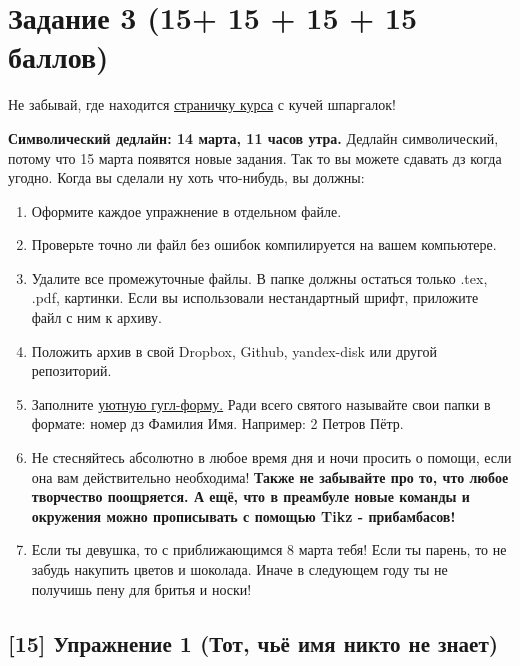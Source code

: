 \documentclass[12pt, a4paper, oneside]{article}
\begin{document}
\section*{Задание 3 (15+ 15 + 15 + 15 баллов)  }

Не забывай, где находится  \href{https://fulyankin.github.io/LaTeX/}{страничку курса} с кучей шпаргалок!

   \textbf{Символический дедлайн: 14 марта, 11 часов утра.}   Дедлайн символический, потому что 15 марта появятся новые задания. Так то вы можете сдавать дз когда угодно. Когда вы сделали ну хоть что-нибудь, вы должны: 

\begin{enumerate}
\item Оформите каждое упражнение в отдельном файле.
\item Проверьте точно ли файл без ошибок компилируется на вашем компьютере.
\item Удалите все промежуточные файлы. В папке должны остаться только .tex, .pdf, картинки. Если вы использовали нестандартный шрифт, приложите файл с ним к архиву.
\item Положить архив в	свой	Dropbox,	Github,	yandex-disk	или другой	репозиторий.
\item Заполните	\href{https://docs.google.com/forms/d/e/1FAIpQLSe11kxKVfv07iCL1E9yNX7ll9swKImiVwRr1H70lslGzInRSg/viewform}{уютную гугл-форму.} Ради всего святого называйте свои папки в формате: номер дз Фамилия Имя. Например: 2 Петров Пётр.
\item Не стесняйтесь абсолютно в любое время дня и ночи просить о помощи, если она вам действительно необходима! \textbf{Также не забывайте про то, что любое творчество поощряется. А ещё, что в преамбуле новые команды и окружения можно прописывать с помощью Tikz - прибамбасов! }
\item Если ты девушка, то с приближающимся 8 марта тебя! Если ты парень, то не забудь накупить цветов и шоколада. Иначе в следующем году ты не получишь пену для бритья и носки!
\end{enumerate}

\subsection*{[15]   Упражнение 1 (Тот, чьё имя никто не знает)}
\end{document}
